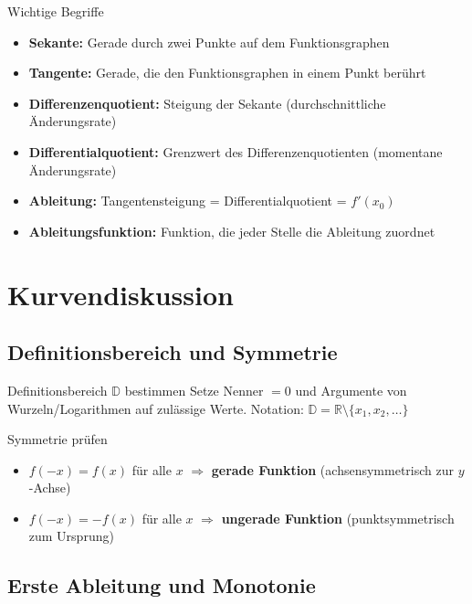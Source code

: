 \documentclass[a4paper,fontsize = 7pt]{scrartcl}
\begin{document}
\begin{subbox}{Wichtige Begriffe}
	\begin{itemize}
		\item \textbf{Sekante:} Gerade durch zwei Punkte auf dem Funktionsgraphen
		\item \textbf{Tangente:} Gerade, die den Funktionsgraphen in einem Punkt berührt
		\item \textbf{Differenzenquotient:} Steigung der Sekante (durchschnittliche Änderungsrate)
		\item \textbf{Differentialquotient:} Grenzwert des Differenzenquotienten (momentane Änderungsrate)
		\item \textbf{Ableitung:} Tangentensteigung = Differentialquotient = $f'(x_0)$
		\item \textbf{Ableitungsfunktion:} Funktion, die jeder Stelle die Ableitung zuordnet
	\end{itemize}
\end{subbox}

\section{Kurvendiskussion}

\subsection{Definitionsbereich und Symmetrie}

\begin{mainbox}{Definitionsbereich $\mathbb{D}$ bestimmen}
	Setze Nenner $= 0$ und Argumente von Wurzeln/Logarithmen auf zulässige Werte.
	Notation: $\mathbb{D} = \mathbb{R}\setminus\{x_1,x_2,\dots\}$
\end{mainbox}

\begin{subbox}{Symmetrie prüfen}
	\begin{itemize}
		\item $f(-x) = f(x)$ für alle $x$ $\Rightarrow$ \textbf{gerade Funktion} (achsensymmetrisch zur $y$-Achse)
		\item $f(-x) = -f(x)$ für alle $x$ $\Rightarrow$ \textbf{ungerade Funktion} (punktsymmetrisch zum Ursprung)
	\end{itemize}
\end{subbox}

\subsection{Erste Ableitung und Monotonie}
\end{document}

